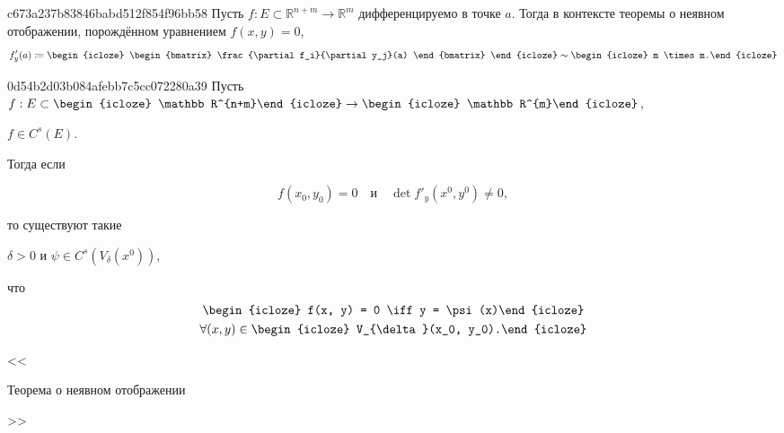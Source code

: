 \begin{note}{c673a237b83846babd512f854f96bb58}
    Пусть \({ f : E \subset \mathbb R^{n + m} \to \mathbb R^{m} }\) дифференцируемо в точке \({ a }\).
    Тогда в контексте теоремы о неявном отображении, порождённом уравнением \({ f(x, y) = 0 }\),
    \[
        f'_{y}(a) \coloneqq
        \begin{icloze}{1}
            \begin{bmatrix}
                \frac{\partial f_i}{\partial y_j}(a)
            \end{bmatrix}
        \end{icloze}
        \sim \begin{icloze}{2}m \times m.\end{icloze}
    \]
\end{note}

\begin{note}{0d54b2d03b084afebb7c5cc072280a39}
    Пусть \({ f : E \subset \begin{icloze}{4}\mathbb R^{n+m}\end{icloze} \to \begin{icloze}{4}\mathbb R^{m}\end{icloze} }\), \begin{icloze}{5}\({ f \in C^{s}(E) }\).\end{icloze}
    Тогда если
    \begin{icloze}{1}
        \[
            f(x_{0}, y_{0}) = 0 \quad \text{и} \quad \det f'_{y}(x^{0}, y^{0}) \neq 0,
        \]
    \end{icloze}
    то существуют такие \begin{icloze}{2}\({ \delta > 0 }\) и \({ \psi \in C^{s}(V_{\delta}(x^0)) }\),\end{icloze} что
    \[
        \begin{gathered}
            \begin{icloze}{3}f(x, y) = 0 \iff y = \psi(x)\end{icloze} \\
            \forall (x, y) \in \begin{icloze}{6}V_{\delta}(x_0, y_0).\end{icloze}
        \end{gathered}
    \]

    \begin{center}
        \tiny
        <<\begin{icloze}{7}Теорема о неявном отображении\end{icloze}>>
    \end{center}
\end{note}

